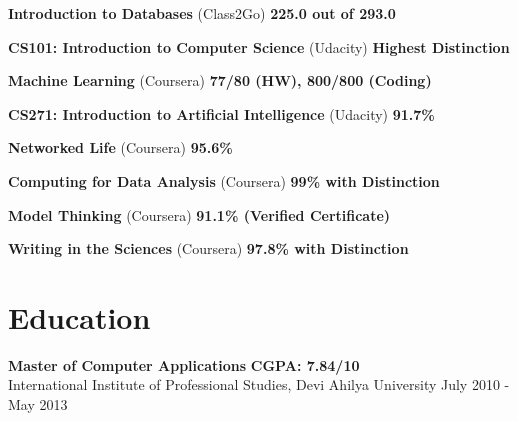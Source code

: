 \documentclass[margin,line]{resume}
\begin{document}
\begin{resume}
\begin{list2}
	\item \textbf{Introduction to Databases} (Class2Go) \hspace{64mm} \textbf{225.0 out of 293.0}

	\item \textbf{CS101: Introduction to Computer Science} (Udacity) \hspace{34mm} \textbf{Highest Distinction}

	\item \textbf{Machine Learning} (Coursera) \hspace{54mm} \textbf{77/80 (HW), 800/800 (Coding)}

	\item \textbf{CS271: Introduction to Artificial Intelligence} (Udacity) \hspace{52mm} \textbf{91.7\%}

	\item \textbf{Networked Life} (Coursera) \hspace{104mm} \textbf{95.6\%}

	\item \textbf{Computing for Data Analysis} (Coursera) \hspace{52mm} \textbf{99\% with Distinction}

    \item \textbf{Model Thinking} (Coursera) \hspace{65mm} \textbf{91.1\% (Verified Certificate)}

	\item \textbf{Writing in the Sciences} (Coursera) \hspace{60mm} \textbf{97.8\% with Distinction}
	\end{list2}

    \section{\mysidestyle Education}

    \begin{list2}
	\item \textbf{Master of Computer Applications} \hspace{73mm} \textbf{CGPA: 7.84/10} \\ International Institute of Professional Studies, Devi Ahilya University \hspace{17mm} July 2010 - May 2013
	\end{list2}


\end{resume}
\end{document}

